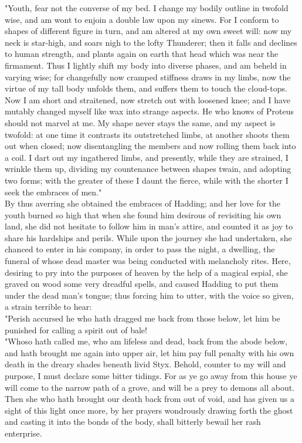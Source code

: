 \documentclass[10pt,a4paper]{report}
\begin{document}
"Youth, fear not the converse of my bed. I change my bodily outline in twofold wise, and am wont to enjoin a double law upon my sinews. For I conform to shapes of different figure in turn, and am altered at my own sweet will: now my neck is star-high, and soars nigh to the lofty Thunderer; then it falls and declines to human strength, and plants again on earth that head which was near the firmament. Thus I lightly shift my body into diverse phases, and am beheld in varying wise; for changefully now cramped stiffness draws in my limbs, now the virtue of my tall body unfolds them, and suffers them to touch the cloud-tops. Now I am short and straitened, now stretch out with loosened knee; and I have mutably changed myself like wax into strange aspects. He who knows of Proteus should not marvel at me. My shape never stays the same, and my aspect is twofold: at one time it contrasts its outstretched limbs, at another shoots them out when closed; now disentangling the members and now rolling them back into a coil. I dart out my ingathered limbs, and presently, while they are strained, I wrinkle them up, dividing my countenance between shapes twain, and adopting two forms; with the greater of these I daunt the fierce, while with the shorter I seek the embraces of men."\\

By thus averring she obtained the embraces of Hadding; and her love for the youth burned so high that when she found him desirous of revisiting his own land, she did not hesitate to follow him in man's attire, and counted it as joy to share his hardships and perils. While upon the journey she had undertaken, she chanced to enter in his company, in order to pass the night, a dwelling, the funeral of whose dead master was being conducted with melancholy rites. Here, desiring to pry into the purposes of heaven by the help of a magical espial, she graved on wood some very dreadful spells, and caused Hadding to put them under the dead man's tongue; thus forcing him to utter, with the voice so given, a strain terrible to hear:\\

"Perish accursed he who hath dragged me back from those below, let him be punished for calling a spirit out of bale!\\

"Whoso hath called me, who am lifeless and dead, back from the abode below, and hath brought me again into upper air, let him pay full penalty with his own death in the dreary shades beneath livid Styx. Behold, counter to my will and purpose, I must declare some bitter tidings. For as ye go away from this house ye will come to the narrow path of a grove, and will be a prey to demons all about. Then she who hath brought our death back from out of void, and has given us a sight of this light once more, by her prayers wondrously drawing forth the ghost and casting it into the bonds of the body, shall bitterly bewail her rash enterprise.\\
\end{document}
